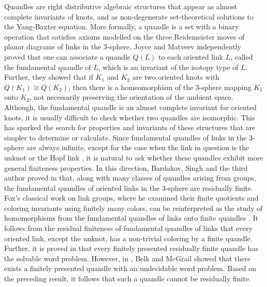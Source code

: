 \documentclass[12pt]{amsart}
\theoremstyle{definition}
\numberwithin{equation}{subsection}
\begin{document}
Quandles are right distributive algebraic structures that appear as almost complete invariants of knots, and as non-degenerate set-theoretical solutions to the Yang-Baxter equation. More formally, a quandle is a set with a binary operation that satisfies axioms modelled on the three Reidemeister moves of planar diagrams of links in the 3-sphere. Joyce \cite{Joyce1979}  and Matveev \cite{MR0672410} independently proved that one can associate a quandle $Q(L)$ to each oriented link $L$, called the fundamental quandle of $L$,  which is an invariant of the isotopy type of $L$. Further, they showed that if $K_1$ and $K_2$ are two oriented knots with $Q(K_1) \cong Q(K_2)$, then there is a homeomorphism of the 3-sphere mapping $K_1$ onto $K_2$, not necessarily preserving the orientation of the ambient space. Although, the fundamental quandle is an almost complete invariant for oriented  knots, it is usually difficult to check whether two quandles are isomorphic. This has sparked the search for properties and invariants of these structures that are simpler to determine or calculate. Since fundamental quandles of links in the 3-sphere are always infinite, except for the case when the link in question is the unknot or the Hopf link \cite{MR3938088}, it is natural to ask whether these quandles exhibit more general finiteness properties. In this direction, Bardakov, Singh and the third author proved in \cite{MR3981139, MR4075375} that, along with many classes of quandles arising from groups, the fundamental quandles of oriented links in the 3-sphere are residually finite. Fox's classical work on link groups, where he examined their finite quotients and coloring invariants using finitely many colors, can be reinterpreted as the study of homomorphisms from the fundamental quandles of links onto finite quandles  \cite{MR0146828}. It follows from the residual finiteness of fundamental quandles of links that every oriented link, except the unknot, has a non-trivial coloring by a finite quandle.  Further, it is proved in  \cite{MR3981139}  that every finitely presented residually finite quandle has the solvable word problem.  However, in \cite{MR3440592}, Belk and McGrail showed that there exists a finitely presented quandle with an undecidable word problem. Based on the preceding result, it follows that such a quandle cannot be residually finite. 
\end{document}
